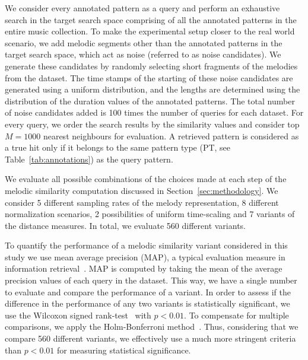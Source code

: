 We consider every annotated pattern as a query and perform an exhaustive search in the target search space comprising of all the annotated patterns in the entire music collection. To make the experimental setup closer to the real world scenario, we add melodic segments other than the annotated patterns in the target search space, which act as noise (referred to as noise candidates). We generate these candidates by randomly selecting short fragments of the melodies from the dataset. The time stamps of the starting of these noise candidates are generated using a uniform distribution, and the lengths are determined using the distribution of the duration values of the annotated patterns. The total number of noise candidates added is 100 times the number of queries for each dataset. For every query, we order the search results by the similarity values and consider top $M=1000$ nearest neighbours for evaluation. A retrieved pattern is considered as a true hit only if it belongs to the same pattern type (PT, see Table~\ref{tab:annotations}) as the query pattern. 


We evaluate all possible combinations of the choices made at each step of the melodic similarity computation discussed in Section~\ref{sec:methodology}. We consider 5 different sampling rates of the melody representation, 8 different normalization scenarios, 2 possibilities of uniform time-scaling and 7 variants of the distance measures. In total, we evaluate 560 different variants.

To quantify the performance of a melodic similarity variant considered in this study we use mean average precision (MAP), a typical evaluation measure in information retrieval~\citep{manning2008introduction}. MAP is computed by taking the mean of the average precision values of each query in the dataset. This way, we have a single number to evaluate and compare the performance of a variant. In order to assess if the difference in the performance of any two variants is statistically significant, we use the Wilcoxon signed rank-test~\citep{wilcoxon1945individual} with $p < 0.01$. To compensate for multiple comparisons, we apply the Holm-Bonferroni method~\citep{holm1979simple}. Thus, considering that we compare 560 different variants, we effectively use a much more stringent criteria than $p < 0.01$ for measuring statistical significance.


